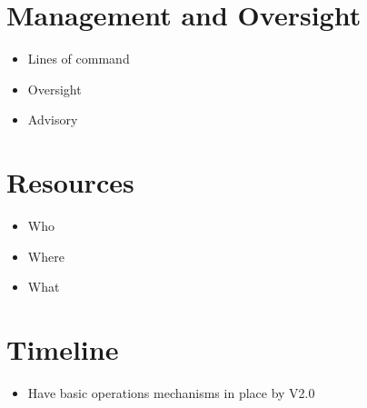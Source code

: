 \section{Management and Oversight}
\begin{itemize}
\item Lines of command
\item Oversight
\item Advisory
\end{itemize}


\section{Resources}
\begin{itemize}
\item Who
\item Where
\item What
\end{itemize}


\section{Timeline}
\begin{itemize}
\item Have basic operations mechanisms in place by V2.0
\end{itemize}



